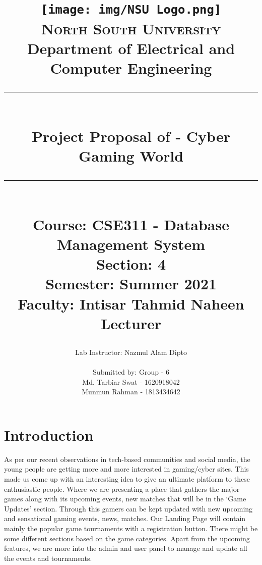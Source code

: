 \documentclass[11pt]{report}
\newcommand{\HRule}[1]{\rule{\linewidth}{#1}}
\begin{document}
\date{}

\title{ \normalsize 
		
		\texttt{[image: img/NSU Logo.png]}\\[.5cm]
		\LARGE \textsc{North South University} \\ 
		\LARGE{Department of Electrical and Computer Engineering } \\
		\vspace{5}
		\HRule{2pt} \\
		\LARGE \textbf{Project Proposal of - Cyber Gaming World} 
		\HRule{2pt} \\ [0.5cm]
		
		\large {Course: CSE311 - Database Management System} \\
		\large {Section: 4}\\
		\large {Semester: Summer 2021}\\
		\textbf \large  Faculty: Intisar Tahmid Naheen \\
        {Lecturer} \\
		\normalsize }


\author{
        Lab Instructor: Nazmul Alam Dipto \\
        \\
		Submitted by: Group - 6 \\
		Md. Tarbiar Swat - 1620918042 \\
		Munmun Rahman - 1813434642 }


		 
\maketitle


\section*{Introduction}

As per our recent observations in tech-based communities and social media, the young people are getting more and more interested in gaming/cyber sites. This made us come up with an  interesting idea to give an ultimate platform to these enthusiastic people. Where we are presenting a place that gathers the major games along with its upcoming events, new matches that will be in the ‘Game Updates’ section. Through this gamers can be kept updated with new upcoming and sensational gaming events, news, matches. Our Landing Page will contain mainly the popular game tournaments with a registration button. There might be some different sections based on the game categories. Apart from the upcoming features, we are more into the admin and user panel to manage and update all the events and tournaments. 
\end{document}
